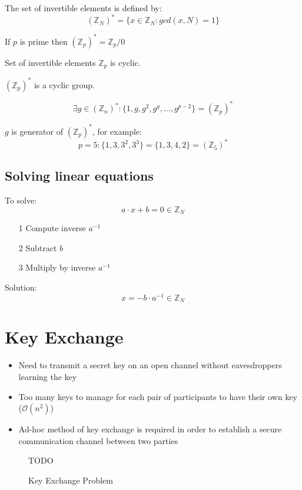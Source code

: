 \documentclass[a4paper]{article}
\begin{document}
The set of invertible elements is defined by:
\[(\mathbb{Z}_{N})^{*} = \{x \in \mathbb{Z}_{N} : gcd(x, N) = 1\}\]

If $p$ is prime then $(\mathbb{Z}_{p})^{*} = \mathbb{Z}_{p} / {0}$

Set of invertible elements $\mathbb{Z}_{p}$ is cyclic.

$(\mathbb{Z}_{p})^{*}$ is a cyclic group.

\[
  \exists g \in (\mathbb{Z}_{n})^{*} :
  \{1, g, g^{2}, g^{g}, \ldots, g^{p-2}\} = (\mathbb{Z}_{p})^{*}
\]

$g$ is  generator of $(\mathbb{Z}_{p})^{*}$, for example:
\[p = 5: \{1, 3, 3^{2}, 3^{3}\} = \{1, 3, 4, 2\} = (\mathbb{Z}_{5})^{*}\]

\subsection{Solving linear equations}

To solve:
\[a \cdot x + b = 0 \in \mathbb{Z}_{N}\]

\begin{enumerate}
  \item[1] Compute inverse $a^{-1}$
  \item[2] Subtract $b$
  \item[3] Multiply by inverse $a^{-1}$
\end{enumerate}

Solution:
\[x = -b \cdot a^{-1} \in \mathbb{Z}_{N}\]

\section{Key Exchange}

\begin{itemize}
  \item Need to transmit a secret key on an open channel without eavesdroppers
        learning the key
  \item Too many keys to manage for each pair of participants to have their own
        key ($\mathcal{O}(n^{2})$)
  \item Ad-hoc method of key exchange is required in order to establish a secure
        communication channel between two parties
\end{itemize}

\begin{figure}[h!]
  \centering
  TODO
  \caption{Key Exchange Problem}
  \label{fig:key_exchange_problem}
\end{figure}
\FloatBarrier
\end{document}
